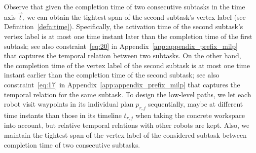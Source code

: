 \documentclass[Afour,sageh,times]{sagej}
\begin{document}
{{ %

 {Observe that given the completion time of two consecutive subtasks in the time axis $\vec{t}$, we can obtain the tightest span of the second subtask's vertex label (see Definition~\ref{defn:time}). Specifically, the activation time of the second subtask's vertex label is at most one time instant later than the completion time of the first subtask; see also constraint~\eqref{eq:20} in Appendix~\ref{app:appendix_prefix_milp} that captures the temporal relation between two subtasks. On the other hand, the  completion time of the vertex label of the second subtask is at most one time instant earlier than the completion time of the second subtask; see also constraint~\eqref{eq:17} in Appendix~\ref{app:appendix_prefix_milp} that captures the temporal relation for the same subtask.  To design the low-level paths,  we let each robot visit waypoints in its individual plan $p_{r,j}$ sequentially, maybe at different time instants than those in its timeline $t_{r,j}$ when taking the concrete workspace into account, but relative temporal relations with other robots  are kept. Also, we maintain the tightest span of the vertex label of the considered subtask between completion time of two consecutive subtasks.}



}}
\end{document}
